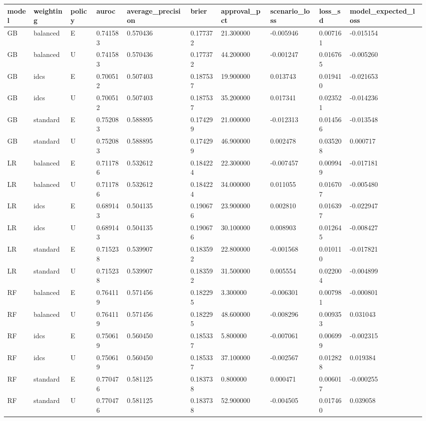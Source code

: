 \begin{tabular}{llllllllll}
\hline
model & weighting & policy & auroc & average\_precision & brier & approval\_pct & scenario\_loss & loss\_sd & model\_expected\_loss \\
\hline
GB & balanced & E & 0.741583 & 0.570436 & 0.177372 & 21.300000 & -0.005946 & 0.007161 & -0.015154 \\
GB & balanced & U & 0.741583 & 0.570436 & 0.177372 & 44.200000 & -0.001247 & 0.016765 & -0.005260 \\
GB & idcs & E & 0.700512 & 0.507403 & 0.187537 & 19.900000 & 0.013743 & 0.019410 & -0.021653 \\
GB & idcs & U & 0.700512 & 0.507403 & 0.187537 & 35.200000 & 0.017341 & 0.023521 & -0.014236 \\
GB & standard & E & 0.752083 & 0.588895 & 0.174299 & 21.000000 & -0.012313 & 0.014566 & -0.013548 \\
GB & standard & U & 0.752083 & 0.588895 & 0.174299 & 46.900000 & 0.002478 & 0.035208 & 0.000717 \\
LR & balanced & E & 0.711786 & 0.532612 & 0.184224 & 22.300000 & -0.007457 & 0.009949 & -0.017181 \\
LR & balanced & U & 0.711786 & 0.532612 & 0.184224 & 34.000000 & 0.011055 & 0.016707 & -0.005480 \\
LR & idcs & E & 0.689143 & 0.504135 & 0.190676 & 23.900000 & 0.002810 & 0.016397 & -0.022947 \\
LR & idcs & U & 0.689143 & 0.504135 & 0.190676 & 30.100000 & 0.008903 & 0.012645 & -0.008427 \\
LR & standard & E & 0.715238 & 0.539907 & 0.183592 & 22.800000 & -0.001568 & 0.010110 & -0.017821 \\
LR & standard & U & 0.715238 & 0.539907 & 0.183592 & 31.500000 & 0.005554 & 0.022004 & -0.004899 \\
RF & balanced & E & 0.764119 & 0.571456 & 0.182295 & 3.300000 & -0.006301 & 0.007981 & -0.000801 \\
RF & balanced & U & 0.764119 & 0.571456 & 0.182295 & 48.600000 & -0.008296 & 0.009353 & 0.031043 \\
RF & idcs & E & 0.750619 & 0.560450 & 0.185337 & 5.800000 & -0.007061 & 0.006999 & -0.002315 \\
RF & idcs & U & 0.750619 & 0.560450 & 0.185337 & 37.100000 & -0.002567 & 0.012828 & 0.019384 \\
RF & standard & E & 0.770476 & 0.581125 & 0.183738 & 0.800000 & 0.000471 & 0.006017 & -0.000255 \\
RF & standard & U & 0.770476 & 0.581125 & 0.183738 & 52.900000 & -0.004505 & 0.017460 & 0.039058 \\
\hline
\end{tabular}
